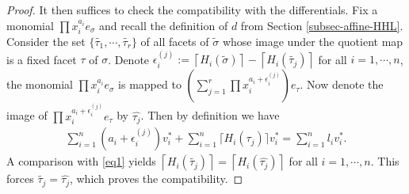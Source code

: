\documentclass[10pt,a4paper]{amsart}
\begin{document}
\begin{proof}
    It then suffices to check the compatibility with the differentials. Fix a monomial $\prod x_i^{a_i} e_{\sigma}$ and recall the definition of $d$ from Section \ref{subsec-affine-HHL}. Consider the set $\{\widetilde{\tau_1},\cdots,\widetilde{\tau_r}\}$ of all facets of $\widetilde{\sigma}$ whose image under the quotient map is a fixed facet $\tau$ of $\sigma$. Denote $\epsilon_{i}^{(j)}:=\left\lceil H_{i}(\widetilde{\sigma})  \right\rceil - \left\lceil H_{i}(\widetilde{\tau_j})  \right\rceil $ for all $i=1,\cdots,n$, the monomial $\prod x_i^{a_i} e_{\sigma}$ is mapped to $\left(\sum_{j=1}^r \prod x_i^{a_i+\epsilon_{i}^{(j)}}\right) e_{\tau}$. Now denote the image of $\prod x_i^{a_i+\epsilon_{i}^{(j)}}e_{\tau}$ by $\widehat{\tau_j}$. Then by definition we have
    \begin{align*}
        \sum_{i=1}^n (a_i +\epsilon_{i}^{(j)} )v_i^* + \sum_{i=1}^n \lceil H_i(\widehat{\tau_j}) \rceil v_i^* = \sum_{i=1}^n l_i v_i^*.
    \end{align*}
    A comparison with \eqref{eq1} yields $\left\lceil H_{i}(\widetilde{\tau_j})  \right\rceil = \left\lceil H_{i}(\widehat{\tau_j})  \right\rceil$ for all $i=1,\cdots,n$. This forces $\widetilde{\tau_j} = \widehat{\tau_j}$, which proves the compatibility.
\end{proof}
\end{document}
